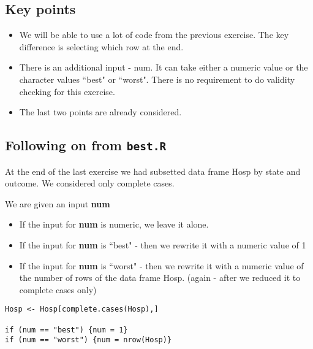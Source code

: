 \documentclass[]{article}
\begin{document}
\subsection{Key points}
\begin{itemize}
\item We will be able to use a lot of code from the previous exercise. The key difference is selecting which row at the end.
\item There is an additional input - num. It can take either a numeric value or the character values ``best" or ``worst". There is no requirement to do validity checking for this exercise.

\item The last two points are already considered.
\end{itemize}

\subsection{Following on from \texttt{best.R}}

At the end of the last exercise we had subsetted data frame Hosp by state and outcome. We considered only complete cases.

We are given an input \textbf{num}

\begin{itemize}
\item If the input for \textbf{num} is numeric, we leave it alone.
\item If the input for \textbf{num} is ``best" - then we rewrite it with a numeric value of 1
\item If the input for \textbf{num} is ``worst" - then we rewrite it with a numeric value of the number of rows of the data frame Hosp. (again - after we reduced it to complete cases only)
\end{itemize}

\begin{framed}
\begin{verbatim}
Hosp <- Hosp[complete.cases(Hosp),]

if (num == "best") {num = 1}
if (num == "worst") {num = nrow(Hosp)}
\end{verbatim}
\end{framed}
\end{document}
